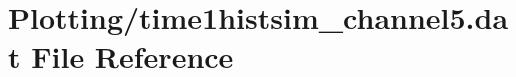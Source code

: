 \hypertarget{Plotting_2time1histsim__channel5_8dat}{}\section{Plotting/time1histsim\+\_\+channel5.dat File Reference}
\label{Plotting_2time1histsim__channel5_8dat}
